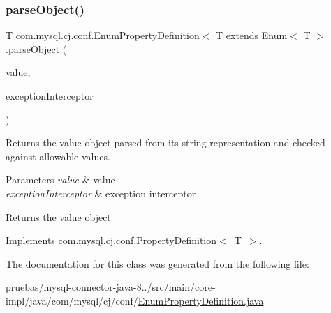 \subsubsection{\texorpdfstring{parse\+Object()}{parseObject()}}
{\footnotesize\ttfamily T \mbox{\hyperlink{classcom_1_1mysql_1_1cj_1_1conf_1_1_enum_property_definition}{com.\+mysql.\+cj.\+conf.\+Enum\+Property\+Definition}}$<$ T extends Enum$<$ T $>$.parse\+Object (\begin{DoxyParamCaption}\item[{String}]{value,  }\item[{\mbox{\hyperlink{interfacecom_1_1mysql_1_1cj_1_1exceptions_1_1_exception_interceptor}{Exception\+Interceptor}}}]{exception\+Interceptor }\end{DoxyParamCaption})}

Returns the value object parsed from it\textquotesingle{}s string representation and checked against allowable values.


\begin{DoxyParams}{Parameters}
{\em value} & value \\
\hline
{\em exception\+Interceptor} & exception interceptor\\
\hline
\end{DoxyParams}
\begin{DoxyReturn}{Returns}
the value object 
\end{DoxyReturn}


Implements \mbox{\hyperlink{interfacecom_1_1mysql_1_1cj_1_1conf_1_1_property_definition_a6abfb25b6102c876eddc4f10aca5687c}{com.\+mysql.\+cj.\+conf.\+Property\+Definition$<$ T $>$}}.



The documentation for this class was generated from the following file\+:\begin{DoxyCompactItemize}
\item 
pruebas/mysql-\/connector-\/java-\/8../src/main/core-\/impl/java/com/mysql/cj/conf/\mbox{\hyperlink{_enum_property_definition_8java}{Enum\+Property\+Definition.\+java}}\end{DoxyCompactItemize}
